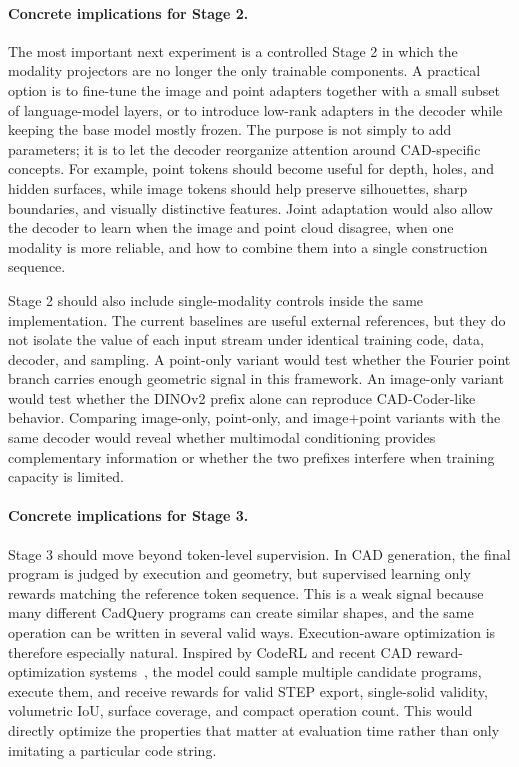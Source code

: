 \documentclass{article}
\begin{document}
\paragraph{Concrete implications for Stage 2.}
The most important next experiment is a controlled Stage 2 in which the modality projectors are no longer the only trainable components. A practical option is to fine-tune the image and point adapters together with a small subset of language-model layers, or to introduce low-rank adapters in the decoder while keeping the base model mostly frozen. The purpose is not simply to add parameters; it is to let the decoder reorganize attention around CAD-specific concepts. For example, point tokens should become useful for depth, holes, and hidden surfaces, while image tokens should help preserve silhouettes, sharp boundaries, and visually distinctive features. Joint adaptation would also allow the decoder to learn when the image and point cloud disagree, when one modality is more reliable, and how to combine them into a single construction sequence.

Stage 2 should also include single-modality controls inside the same implementation. The current baselines are useful external references, but they do not isolate the value of each input stream under identical training code, data, decoder, and sampling. A point-only variant would test whether the Fourier point branch carries enough geometric signal in this framework. An image-only variant would test whether the DINOv2 prefix alone can reproduce CAD-Coder-like behavior. Comparing image-only, point-only, and image+point variants with the same decoder would reveal whether multimodal conditioning provides complementary information or whether the two prefixes interfere when training capacity is limited.

\paragraph{Concrete implications for Stage 3.}
Stage 3 should move beyond token-level supervision. In CAD generation, the final program is judged by execution and geometry, but supervised learning only rewards matching the reference token sequence. This is a weak signal because many different CadQuery programs can create similar shapes, and the same operation can be written in several valid ways. Execution-aware optimization is therefore especially natural. Inspired by CodeRL and recent CAD reward-optimization systems~\cite{le2022coderl,kolodiazhnyi2025cadrille,elistratov2026cadevolve}, the model could sample multiple candidate programs, execute them, and receive rewards for valid STEP export, single-solid validity, volumetric IoU, surface coverage, and compact operation count. This would directly optimize the properties that matter at evaluation time rather than only imitating a particular code string.
\end{document}
